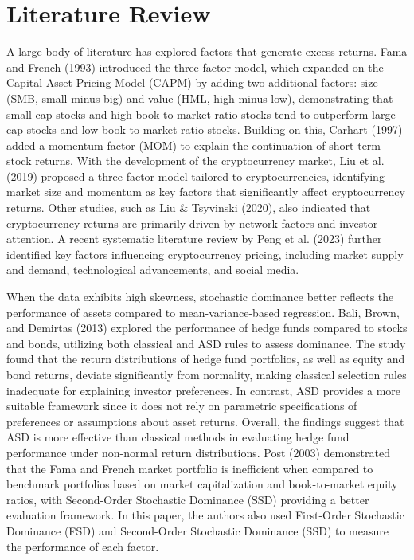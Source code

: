 \documentclass{article}
\begin{document}
\hypertarget{literature-review}{%
\section{Literature Review}\label{literature-review}}

A large body of literature has explored factors that generate excess returns. Fama and French (1993) introduced the three-factor model, which expanded on the Capital Asset Pricing Model (CAPM) by adding two additional factors: size (SMB, small minus big) and value (HML, high minus low), demonstrating that small-cap stocks and high book-to-market ratio stocks tend to outperform large-cap stocks and low book-to-market ratio stocks. Building on this, Carhart (1997) added a momentum factor (MOM) to explain the continuation of short-term stock returns. With the development of the cryptocurrency market, Liu et al. (2019) proposed a three-factor model tailored to cryptocurrencies, identifying market size and momentum as key factors that significantly affect cryptocurrency returns. Other studies, such as Liu \& Tsyvinski (2020), also indicated that cryptocurrency returns are primarily driven by network factors and investor attention. A recent systematic literature review by Peng et al. (2023) further identified key factors influencing cryptocurrency pricing, including market supply and demand, technological advancements, and social media. 

When the data exhibits high skewness, stochastic dominance better reflects the performance of assets compared to mean-variance-based regression. Bali, Brown, and Demirtas (2013) explored the performance of hedge funds compared to stocks and bonds, utilizing both classical and ASD rules to assess dominance. The study found that the return distributions of hedge fund portfolios, as well as equity and bond returns, deviate significantly from normality, making classical selection rules inadequate for explaining investor preferences. In contrast, ASD provides a more suitable framework since it does not rely on parametric specifications of preferences or assumptions about asset returns. Overall, the findings suggest that ASD is more effective than classical methods in evaluating hedge fund performance under non-normal return distributions. Post (2003) demonstrated that the Fama and French market portfolio is inefficient when compared to benchmark portfolios based on market capitalization and book-to-market equity ratios, with Second-Order Stochastic Dominance (SSD) providing a better evaluation framework. In this paper, the authors also used First-Order Stochastic Dominance (FSD) and Second-Order Stochastic Dominance (SSD) to measure the performance of each factor.
\end{document}
